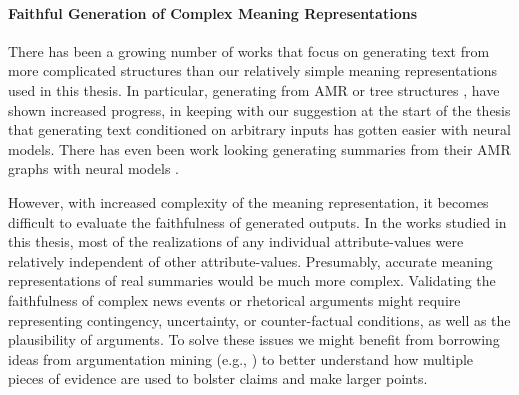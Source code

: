 \paragraph{Faithful Generation of Complex Meaning Representations} There has
been a growing number of works that focus on generating text from more
complicated structures than our relatively simple meaning representations used
in this thesis. In particular, generating from AMR
\citep{castroferreira2017,wang2020} or tree structures
\citep{balakrishnan2019}, have shown increased progress, in keeping with our
suggestion at the start of the thesis that generating text conditioned on
arbitrary inputs has gotten easier with neural models.  There has even been
work looking generating summaries from their AMR graphs with neural models
\citep{hardy2018}. 

However, with increased complexity of the meaning representation, it becomes
difficult to evaluate the faithfulness of generated outputs. In the works
studied in this thesis, most of the realizations of any individual
attribute-values were relatively independent of other attribute-values.
Presumably, accurate meaning representations of real summaries would be much
more complex.  Validating the faithfulness of complex news events or
rhetorical arguments might require representing contingency, uncertainty, or
counter-factual conditions, as well as the plausibility of arguments. To solve
these issues we might benefit from borrowing ideas from argumentation mining
(e.g., \citep{chakrabarty2019}) to better understand how multiple pieces of
evidence are used to bolster claims and make larger points.
